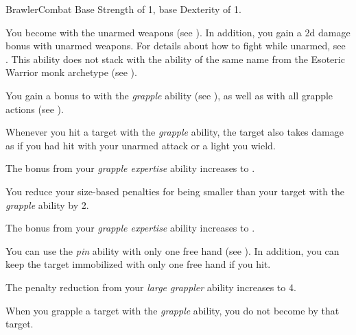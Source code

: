     \begin{feat}{Brawler}{Combat}
        \featpre Base Strength of 1, base Dexterity of 1.

         You become  with the unarmed weapons  (see ).
        In addition, you gain a \plus2d damage bonus with unarmed weapons.
        For details about how to fight while unarmed, see .
        This ability does not stack with the ability of the same name from the Esoteric Warrior monk archetype (see ).

         You gain a  bonus to  with the \textit{grapple} ability (see ), as well as with all grapple actions (see ).

         Whenever you hit a target with the \textit{grapple} ability, the target also takes damage as if you had hit with your unarmed attack or a light  you wield.

         The bonus from your \textit{grapple expertise} ability increases to .

         You reduce your size-based penalties for being smaller than your target with the \textit{grapple} ability by 2.

         The bonus from your \textit{grapple expertise} ability increases to .

         You can use the \textit{pin} ability with only one free hand (see ).
        In addition, you can keep the target immobilized with only one free hand if you hit.

         The penalty reduction from your \textit{large grappler} ability increases to 4.

         When you grapple a target with the \textit{grapple} ability, you do not become \grappled by that target.
    \end{feat}

